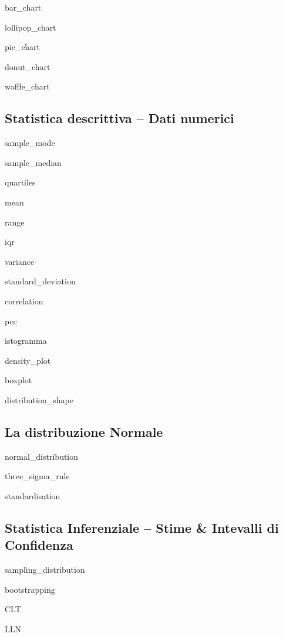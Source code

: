 \documentclass{report}
\begin{document}
\noindent \gls{bar_chart}

\noindent \gls{lollipop_chart}

\noindent \gls{pie_chart}

\noindent \gls{donut_chart}

\noindent \gls{waffle_chart}


\subsection*{Statistica descrittiva -- Dati numerici}


\noindent \gls{sample_mode}

\noindent \gls{sample_median}

\noindent \gls{quartiles}

\noindent \gls{mean}

\noindent \gls{range}

\noindent \gls{iqr}

\noindent \gls{variance}

\noindent \gls{standard_deviation}

\noindent \gls{correlation}

\noindent \gls{pcc}

\noindent \gls{istogramma}

\noindent \gls{density_plot}

\noindent \gls{boxplot}

\noindent \gls{distribution_shape}




\subsection*{La distribuzione Normale}

\noindent \gls{normal_distribution}

\noindent \gls{three_sigma_rule}

\noindent \gls{standardisation}



\subsection*{Statistica Inferenziale -- Stime \& Intevalli di Confidenza}

\noindent \gls{sampling_distribution}

\noindent \gls{bootstrapping}

\noindent \gls{CLT}

\noindent \gls{LLN}
\end{document}
